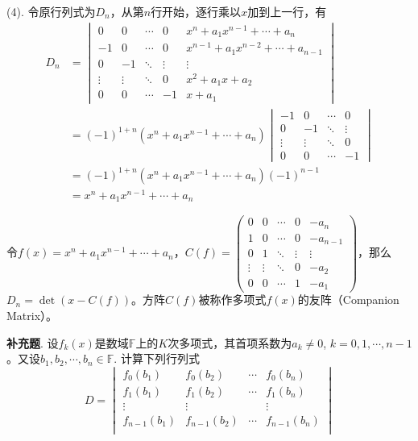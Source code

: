 (4). 令原行列式为$D_n$，从第$n$行开始，逐行乘以$x$加到上一行，有
\begin{align*}
D_n & = \begin{vmatrix} 0 & 0 & \cdots & 0 & x^n+a_1x^{n-1}+\cdots+a_n \\ -1 & 0 & \cdots & 0 & x^{n-1}+a_1x^{n-2}+\cdots+a_{n-1} \\ 0 & -1 & \ddots & \vdots & \vdots \\ \vdots & \vdots & \ddots & 0 & x^2+a_1x+a_2 \\ 0 & 0 & \cdots & -1 & x+a_1 \end{vmatrix} \\
& = (-1)^{1+n}(x^n+a_1x^{n-1}+\cdots+a_n) \begin{vmatrix} -1 & 0 & \cdots & 0 \\ 0 & -1 & \ddots & \vdots \\ \vdots & \vdots & \ddots & 0 \\ 0 & 0 & \cdots & -1 \end{vmatrix} \\
& = (-1)^{1+n}(x^n+a_1x^{n-1}+\cdots+a_n) (-1)^{n-1} \\
& = x^n+a_1x^{n-1}+\cdots+a_n
\end{align*}

令$f(x) = x^n+a_1x^{n-1}+\cdots+a_n$，$C(f) = \begin{pmatrix} 0 & 0 & \cdots & 0 & -a_n \\ 1 & 0 & \cdots & 0 & -a_{n-1} \\ 0 & 1 & \ddots & \vdots & \vdots \\ \vdots & \vdots & \ddots & 0 & -a_2 \\ 0 & 0 & \cdots & 1 & -a_1 \end{pmatrix}$，那么$D_n = \det (x - C(f))$。方阵$C(f)$被称作多项式$f(x)$的友阵（Companion Matrix）。

\newpageorvspace

{\bf 补充题}. 设$f_k(x)$是数域$\mathbb{F}$上的$K$次多项式，其首项系数为$a_k \neq 0$, $k = 0,1,\cdots,n-1$。又设$b_1,b_2,\cdots,b_n\in\mathbb{F}$. 计算下列行列式
$$D = \begin{vmatrix}
f_0(b_1) & f_0(b_2) & \cdots & f_0(b_n) \\
f_1(b_1) & f_1(b_2) & \cdots & f_1(b_n) \\
\vdots & \vdots & & \vdots \\
f_{n-1}(b_1) & f_{n-1}(b_2) & \cdots & f_{n-1}(b_n) \\
\end{vmatrix}$$

